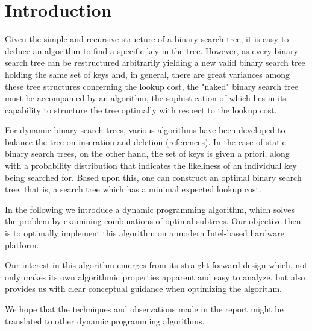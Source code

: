 
\section{Introduction}\label{sec:intro}
Given the simple and recursive structure of a binary search tree, it is easy to
deduce an algorithm to find a specific key in the tree. However, as every binary
search tree can be restructured arbitrarily yielding a new valid binary search
tree holding the same set of keys and, in general, there are great variances
among these tree structures concerning the lookup cost, the "naked"
binary search tree must be accompanied by an algorithm, the sophistication of
which lies in its capability to structure the tree optimally with respect to the
lookup cost.

For dynamic binary search trees, various algorithms have been developed to
balance the tree on inseration and deletion (references). In the case of static
binary search trees, on the other hand, the set of keys is given a priori, along
with a probability distribution that indicates the likeliness of an individual
key being searched for. Based upon this, one can construct an optimal binary
search tree, that is, a search tree which has a minimal expected lookup cost.

In the following we introduce a dynamic programming algorithm, which solves the
problem by examining combinations of optimal subtrees. Our objective then is to
optimally implement this algorithm on a modern Intel-based hardware platform.

Our interest in this algorithm emerges from its straight-forward design which,
not only makes its own algorithmic properties apparent and easy to analyze, but
also provides us with clear conceptual guidance when optimizing the algorithm.

We hope that the techniques and observations made in the report might be
translated to other dynamic programming algorithms.
